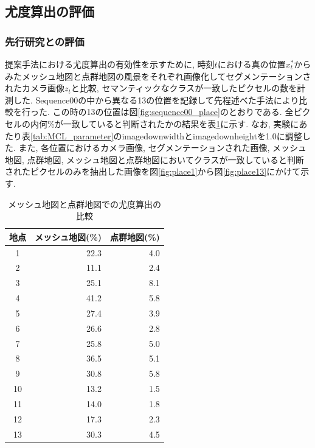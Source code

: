 \subsection{尤度算出の評価}\label{sec:verify_likelihood}



\subsubsection{先行研究との評価}
提案手法における尤度算出の有効性を示すために, 時刻$t$における真の位置$x_{t}^{*}$からみたメッシュ地図と点群地図の風景をそれぞれ画像化してセグメンテーションされたカメラ画像$z_{t}$と比較, セマンティックなクラスが一致したピクセルの数を計測した. Sequence00の中から異なる13の位置を記録して先程述べた手法により比較を行った. この時の13の位置は図\ref{fig:sequence00_place}のとおりである. 全ピクセルの内何\%が一致していると判断されたかの結果を表\ref{tab:cmp_calc_likelihood}に示す. なお, 実験にあたり表\ref{tab:MCL_parameter}のimagedownwidthとimagedownheightを1.0に調整した. また, 各位置におけるカメラ画像, セグメンテーションされた画像, メッシュ地図, 点群地図, メッシュ地図と点群地図においてクラスが一致していると判断されたピクセルのみを抽出した画像を図\ref{fig:place1}から図\ref{fig:place13}にかけて示す. 

\begin{table}[htbp]
\begin{center}
\caption{メッシュ地図と点群地図での尤度算出の比較}
  \begin{tabular}{|c|r|r|} \hline
    地点 & メッシュ地図(\%) & 点群地図(\%)\\ \hline
    1 & 22.3 & 4.0 \\ \hline
    2 & 11.1 & 2.4 \\ \hline
    3 & 25.1 & 8.1 \\ \hline
    4 & 41.2 & 5.8 \\ \hline
    5 & 27.4 & 3.9 \\ \hline
    6 & 26.6 & 2.8 \\ \hline
    7 & 25.8 & 5.0 \\ \hline
    8 & 36.5 & 5.1 \\ \hline
    9 & 30.8 & 5.8 \\ \hline
    10 & 13.2 & 1.5 \\ \hline
    11 & 14.0 & 1.8 \\ \hline
    12 & 17.3 & 2.3 \\ \hline
    13 & 30.3 & 4.5 \\ \hline

  \end{tabular}
  \label{tab:cmp_calc_likelihood}
\end{center}
\end{table}

